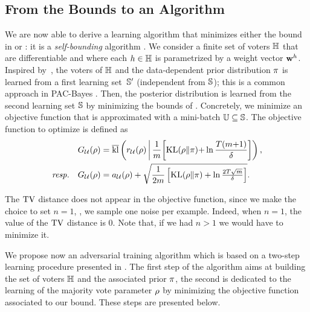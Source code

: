 \subsection{From the Bounds to an Algorithm}

We are now able to derive a learning algorithm that minimizes either the bound in  or : it is a {\it self-bounding} algorithm \citep{Freund1998}.
We consider a finite set of voters $\H$ that are differentiable and where each $\h\in\H$ is parametrized by a weight vector $\wbf^{\h}$.
Inspired by~\cite{MasegosaLorenzenIgelSeldin2020}, the voters of $\H$ and the data-dependent prior distribution $\P$ is learned from a first learning \mbox{set $\S'$} (independent from $\S$); this is a common approach in PAC-Bayes \citep{ParradoHernandezAmbroladzeShaweTaylorSun2012, LeverLavioletteShaweTaylor2013, DziugaiteRoy2018, DziugaiteHsuGharbiehArpinoRoy2021}.
Then, the posterior distribution is learned from the second learning set $\S$ by minimizing the bounds of . 
Concretely, we minimize an objective function that is approximated with a mini-batch $\batch\subseteq\S$.
The objective function to optimize  \resp {} is defined as
\begin{align*}
    \obj_{\dbatch}(\Q) &= \klmax\LP\RiskS_{\dbatch}(\Q) \,\middle|\, \frac{1}{\m}\!\LB\KL(\Q\|\P){+}\ln\frac{\iter(\m{+}1)}{\delta} \RB \RP,\\
    \text{\resp}\quad \obj_{\dbatch}(\Q) &= \RiskMS_{\dbatch}(\Q)+\sqrt{ \frac{1}{2\m} \LB\KL(\Q\|\P)+\ln\tfrac{2T\sqrt{\m}}{\delta}\RB}.
\end{align*}

The $\TV$ distance does not appear in the objective function, since we make the choice to set $n{=}1$, \ie, we sample one noise per example. 
Indeed, when $n{=}1$, the value of the $\TV$ distance is $0$.
Note that, if we had $n>1$ we would have to minimize it.

We propose now an adversarial training algorithm which is based on a two-step learning procedure presented in .
The first step of the algorithm aims at building the set of voters $\H$ and the associated prior $\P$, the second is dedicated to the learning of the majority vote parameter $\Q$ by minimizing the objective function associated to our bound. 
These steps are presented below.\\


